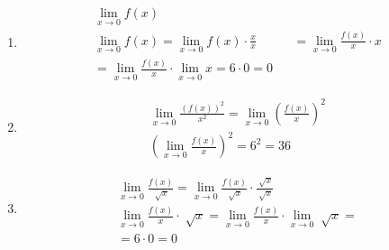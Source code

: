 \documentclass{article}
\begin{document}
\begin{enumerate}
    \item \begin{equation}
        \begin{aligned}
            \lim_{x\rightarrow 0 } f(x) &&\\
            \lim_{x\rightarrow 0}f(x) = \lim_{x\rightarrow 0} f(x) \cdot \frac{x}{x} &&
            = \lim_{x\rightarrow 0}\frac{f(x)}{x}\cdot x \\
            = \lim_{x\rightarrow 0}\frac{f(x)}{x}\cdot \lim_{x\rightarrow 0} x = 6 \cdot 0 = 0 
        \end{aligned}
    \end{equation}
    \item \begin{equation}
        \begin{aligned}
            \lim_{x\rightarrow 0 }\frac{(f(x))^2}{x^2} = \lim_{x\rightarrow 0 }(\frac{f(x)}{x})^2 \\
            (\lim_{x\rightarrow 0 }\frac{f(x)}{x})^2 = 6^2 = 36
        \end{aligned}
    \end{equation}
    \item \begin{equation}
        \begin{aligned}
            \lim_{x\rightarrow 0}\frac{f(x)}{\sqrt[]{x}} = 
            \lim_{x\rightarrow 0} \frac{f(x)}{\sqrt[]{x}} \cdot 
            \frac{\sqrt[]{x}}{\sqrt[]{x}} \\
            \lim_{x\rightarrow 0} \frac{f(x)}{x} \cdot \sqrt[]{x}
            = \lim_{x\rightarrow 0 }\frac{f(x)}{x}\cdot \lim_{x\rightarrow 0} \sqrt[]{x}= \\
            = 6\cdot 0 = 0
        \end{aligned}
    \end{equation}
\end{enumerate}
\end{document}
